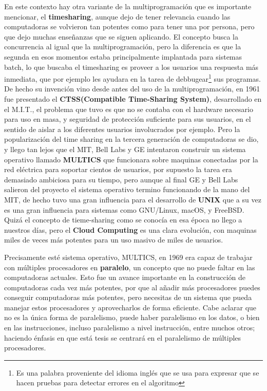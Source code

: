 \documentclass[letterpaper,12pt,oneside]{book}
\begin{document}
		En este contexto hay otra variante de la multiprogramación que es importante mencionar, el \textbf{timesharing}, aunque dejo de tener relevancia cuando
		las computadoras se volvieron tan potentes como para tener una por persona, pero que dejo muchas enseñanzas que se siguen aplicando. El concepto busca
		la concurrencia al igual que la multiprogramación, pero la diferencia es que la segunda en esos momentos estaba principalmente implantada para
		sistemas batch, lo que buscaba el timesharing es proveer a los usuarios una respuesta más inmediata, que por ejemplo les ayudara en la tarea de
	    debbugear\footnote{Es una palabra proveniente del idioma inglés que se usa para expresar que se hacen pruebas para detectar errores en el algoritmo} sus programas. 
	    De hecho su invención vino desde antes del uso de la multiprogramación, en 1961 fue presentado el \textbf{CTSS(Compatible Time-Sharing System)}, desarrollado
	    en el M.I.T., el problema que tuvo es que no se contaba con el hardware necesario para uso en masa, y seguridad de protección suficiente para sus usuarios,
	    en el sentido de aislar a los diferentes usuarios involucrados por ejemplo. Pero la popularización del time sharing en la tercera generación de computadoras
	    se dio, y llego tan lejos que el MIT, Bell Labs y GE intentaron construir un sistema operativo llamado \textbf{MULTICS} que funcionara sobre maquinas conectadas por 
	    la red eléctrica para soportar cientos de usuarios, por supuesto la tarea era demasiado ambiciosa para su tiempo, pero aunque al final GE y Bell Labs
	    salieron del proyecto el sistema operativo termino funcionando de la mano del MIT, de hecho tuvo una gran influencia para el desarrollo de \textbf{UNIX} que
	    a su vez es una gran influencia para sistemas como GNU/Linux, macOS, y FreeBSD. Quizá el concepto de tieme-sharing como se conocía en esa época no llego
	    a nuestros días, pero el \textbf{Cloud Computing} es una clara evolución, con maquinas miles de veces más potentes para un uso masivo de miles de
	    usuarios\cite{tanenbaum_modern_2002}.
		
		Precisamente esté sistema operativo, MULTICS, en 1969 era capaz de trabajar con múltiples procesadores en \textbf{paralelo}, un concepto que
		no puede faltar en las computadoras actuales\cite[p. 899]{silberschatz_operating_2009}. Esto fue un avance importante
		en la construcción de computadoras cada vez más potentes, por que al añadir más procesadores puedes conseguir computadoras más potentes, pero necesitas de un sistema 	
		que pueda manejar estos procesadores y aprovecharlos de forma eficiente. Cabe aclarar que no es la única forma de paralelismo, puede haber paralelismo en
		los datos, o bien en las instrucciones, incluso paralelismo a nivel instrucción, entre muchos otros\cite{null_mariesim_2003}; haciendo énfasis en que está tesis se 
		centrará en	el paralelismo de múltiples procesadores.
		
\end{document}
